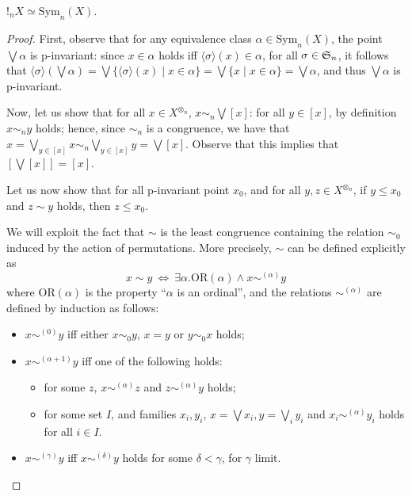 \begin{proposition}
$!_{n}X\simeq \mathrm{Sym}_{n}(X) $.
\end{proposition}
\begin{proof}
First, observe that for any equivalence class $\alpha\in \mathrm{Sym}_{n}(X)$, the point $\bigvee\alpha$ is p-invariant: 
 since $x\in \alpha$ holds iff $\langle \sigma \rangle (x)\in \alpha$, for all $\sigma\in\mathfrak{S}_{n}$, 
it follows that $\langle \sigma \rangle (\bigvee \alpha)=\bigvee\{\langle \sigma \rangle (x)\mid x\in \alpha\}=\bigvee \{x\mid x\in \alpha\}=\bigvee \alpha$, and thus $\bigvee\alpha$ is p-invariant.




Now, let us show that for all $x\in X^{\otimes_{n}}$, $x \sim_{n} \bigvee[x]$: for all $y\in [x]$, by definition $x\sim_{n}y$ holds; hence, since $\sim_{n}$ is a congruence, we have that 
$x=\bigvee_{y\in[x]}x \sim_{n} \bigvee_{y\in [x]}y=\bigvee[x]$.
Observe that this implies that $[\bigvee[x]]=[x]$.


Let us now show that for all p-invariant point $x_{0}$, and for all $y,z\in X^{\otimes_{n}}$, if 
$y\leq x_{0}$ and $z\sim y$ holds, then $z\leq x_{0}$.

We will exploit the fact that $\sim$ is the least congruence containing the relation $\sim_{0}$ induced by the action of permutations. More precisely, $\sim$ can be defined explicitly as 
$$
x\sim y  \ \Leftrightarrow \ \exists \alpha . \mathrm{OR}(\alpha) \land x\sim^{(\alpha)}y
$$
where $\mathrm{OR}(\alpha)$ is the property ``$\alpha$ is an ordinal'', and the relations $\sim^{(\alpha)}$ are defined by induction as follows:
\begin{itemize}
\item $x\sim^{(0)}y$ iff either $x\sim_{0}y$, $x=y$ or $y\sim_{0}x$ holds;
\item $x\sim^{(\alpha+1)}y$ iff one of the following holds:
	\begin{itemize}
	\item for some $z$, $x\sim^{(\alpha)}z$ and $z\sim^{(\alpha)}y$ holds;
	\item for some set $I$, and families $x_{i},y_{i}$, 
	$x=\bigvee x_{i}, y=\bigvee_{i}y_{i}$ and $x_{i} \sim^{(\alpha)}y_{i}$ holds for all $i\in I$.

	\end{itemize}
\item $x\sim^{(\gamma)}y$ iff $x\sim^{(\delta)}y$ holds for some $\delta <\gamma$, for $\gamma$ limit.
\end{itemize}


\end{proof}
